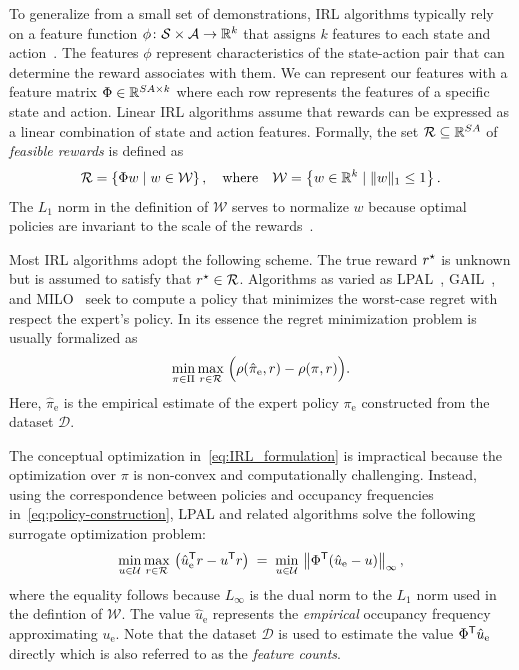 \documentclass[10pt]{article}
\renewcommand{\cite}{\citep}
\theoremstyle{plain}
\theoremstyle{remark}
\begin{document}
To generalize from a small set of demonstrations, IRL algorithms typically rely on a feature function $\phi\colon \mathcal{S} \times \mathcal{A}\to \mathbb{R}^k$ that assigns $k$ features to each state and action~\cite{abbeel2004,Syed2008,Brown2018a,lacotte2019,chang2021mitigating,jonnavittula2021know,arora2021survey}. The features $\phi$ represent characteristics of the state-action pair that can determine the reward associates with them. We can represent our features with a feature matrix $\Phi \in \mathbb{R}^{SA\times k}$ where each row represents the features of a specific state and action. Linear IRL algorithms assume that rewards can be expressed as a linear combination of state and action features. Formally, the set $\mathcal{R} \subseteq \mathbb{R}^{SA}$ of \emph{feasible rewards} is defined as
\begin{equation} \label{eq:r-defintion}
  \mathcal{R} = \left\{ \Phi w \mid  w\in \mathcal{W} \right\}, \quad
  \text{where} \quad
  \mathcal{W} = \left\{ w \in \mathbb{R}^k \mid \| w \|_1 \le 1 \right\}. 
\end{equation}
The $L_1$ norm in the definition of $\mathcal{W}$ serves to normalize $w$ because optimal policies are invariant to the scale of the rewards~\cite{abbeel2004,Syed2008}. 

Most IRL algorithms adopt the following scheme. The true reward $r^{\mathnormal{\star}}$ is unknown but is assumed to satisfy that $r^{\mathnormal{\star}} \in \mathcal{R}$. Algorithms as varied as LPAL~\cite{Syed2008}, GAIL~\cite{Ho2016}, and MILO~\cite{chang2021mitigating} seek to compute a policy that minimizes the worst-case regret with respect the expert's policy. In its essence the regret minimization problem is usually formalized as
\begin{equation} \label{eq:IRL_formulation}
\min_{\pi \in \Pi} \max_{r \in \mathcal{R}} \; \Bigl( \rho(\hat{\pi}_{\mathrm{e}}, r) - \rho(\pi, r) \Bigr).
\end{equation}
Here, $\hat{\pi}_{\mathrm{e}}$ is the empirical estimate of the expert policy $\pi_{\mathrm{e}}$ constructed from the dataset $\mathcal{D}$.

The conceptual optimization in~\eqref{eq:IRL_formulation} is impractical because the optimization over $\pi$ is non-convex and computationally challenging. Instead, using the correspondence between policies and occupancy frequencies in~\eqref{eq:policy-construction}, LPAL and related algorithms solve the following surrogate optimization problem:
\begin{equation} \label{eq:irl-formulation-u}
  \min_{u\in \mathcal{U}} \max_{r\in \mathcal{R}} \, \left(\hat{u}_{\mathrm{e}}^{\mathsf{T}} r - u^{\mathsf{T}} r \right)
  \; =\; 
  \min_{u\in \mathcal{U}} \, \left\| \Phi^{\mathsf{T}}  (\hat{u}_{\mathrm{e}} - u) \right\|_{\infty},
\end{equation}
where the equality follows because $L_{\infty}$ is the dual norm to the $L_1$ norm used in the defintion of $\mathcal{W}$. The value $\hat{u}_{\mathrm{e}}$ represents the \emph{empirical} occupancy frequency approximating $u_{\mathrm{e}}$. Note that the dataset $\mathcal{D}$ is used to estimate the value $\Phi^{\mathsf{T}} \hat{u}_{\mathrm{e}}$ directly which is also referred to as the \emph{feature counts}.
\end{document}
